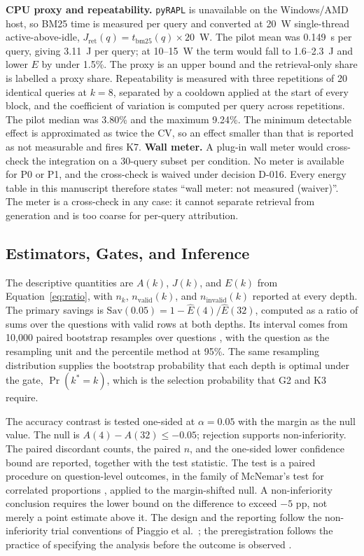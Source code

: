 \documentclass[a4paper,fleqn]{cas-sc}
\begin{document}
\textbf{CPU proxy and repeatability.} \texttt{pyRAPL} is unavailable on the Windows/AMD host, so BM25 time is measured per query and converted at 20~W single-thread active-above-idle, $J_{\mathrm{ret}}(q)=t_{\mathrm{bm25}}(q)\times 20$~W. The pilot mean was 0.149~s per query, giving 3.11~J per query; at 10--15~W the term would fall to 1.6--2.3~J and lower $E$ by under 1.5\%. The proxy is an upper bound and the retrieval-only share is labelled a proxy share. Repeatability is measured with three repetitions of 20 identical queries at $k=8$, separated by a cooldown applied at the start of every block, and the coefficient of variation is computed per query across repetitions. The pilot median was 3.80\% and the maximum 9.24\%. The minimum detectable effect is approximated as twice the CV, so an effect smaller than that is reported as not measurable and fires K7. \textbf{Wall meter.} A plug-in wall meter would cross-check the integration on a 30-query subset per condition. No meter is available for P0 or P1, and the cross-check is waived under decision D-016. Every energy table in this manuscript therefore states ``wall meter: not measured (waiver)''. The meter is a cross-check in any case: it cannot separate retrieval from generation and is too coarse for per-query attribution.

\subsection{Estimators, Gates, and Inference}\label{sec:estimators}\label{sec:gates}

The descriptive quantities are $A(k)$, $J(k)$, and $E(k)$ from Equation~\eqref{eq:ratio}, with $n_{k}$, $n_{\mathrm{valid}}(k)$, and $n_{\mathrm{invalid}}(k)$ reported at every depth. The primary savings is $\mathrm{Sav}(0.05)=1-\widehat E(4)/\widehat E(32)$, computed as a ratio of sums over the questions with valid rows at both depths. Its interval comes from 10{,}000 paired bootstrap resamples over questions \cite{efron1993bootstrap}, with the question as the resampling unit and the percentile method at 95\%. The same resampling distribution supplies the bootstrap probability that each depth is optimal under the gate, $\Pr(k^{*}=k)$, which is the selection probability that G2 and K3 require.

The accuracy contrast is tested one-sided at $\alpha=0.05$ with the margin as the null value. The null is $A(4)-A(32)\le-0.05$; rejection supports non-inferiority. The paired discordant counts, the paired $n$, and the one-sided lower confidence bound are reported, together with the test statistic. The test is a paired procedure on question-level outcomes, in the family of McNemar's test for correlated proportions \cite{mcnemar1947}, applied to the margin-shifted null. A non-inferiority conclusion requires the lower bound on the difference to exceed $-5$ pp, not merely a point estimate above it. The design and the reporting follow the non-inferiority trial conventions of Piaggio et al.\ \cite{piaggio2006}; the preregistration follows the practice of specifying the analysis before the outcome is observed \cite{nosek2018}.
\end{document}

